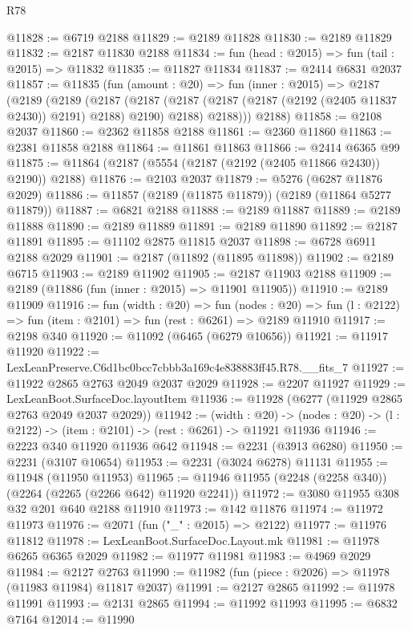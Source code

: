 \begin{lexlean}{R78}
\begin{coremodule}
@11828 := @6719 @2188
@11829 := @2189 @11828
@11830 := @2189 @11829
@11832 := @2187 @11830 @2188
@11834 := fun (head : @2015) => fun (tail : @2015) => @11832
@11835 := @11827 @11834
@11837 := @2414 @6831 @2037
@11857 := @11835
    (fun (amount : @20) =>
    fun (inner : @2015) =>
    @2187
      (@2189
        (@2189
          (@2187
            (@2187 (@2187 (@2187 (@2187 (@2192 (@2405 @11837 @2430)) @2191) @2188) @2190) @2188)
            @2188)))
      @2188)
@11858 := @2108 @2037
@11860 := @2362 @11858 @2188
@11861 := @2360 @11860
@11863 := @2381 @11858 @2188
@11864 := @11861 @11863
@11866 := @2414 @6365 @99
@11875 := @11864 (@2187 (@5554 (@2187 (@2192 (@2405 @11866 @2430)) @2190)) @2188)
@11876 := @2103 @2037
@11879 := @5276 (@6287 @11876 @2029)
@11886 := @11857 (@2189 (@11875 @11879)) (@2189 (@11864 @5277 @11879))
@11887 := @6821 @2188
@11888 := @2189 @11887
@11889 := @2189 @11888
@11890 := @2189 @11889
@11891 := @2189 @11890
@11892 := @2187 @11891
@11895 := @11102 @2875 @11815 @2037
@11898 := @6728 @6911 @2188 @2029
@11901 := @2187 (@11892 (@11895 @11898))
@11902 := @2189 @6715
@11903 := @2189 @11902
@11905 := @2187 @11903 @2188
@11909 := @2189 (@11886 (fun (inner : @2015) => @11901 @11905))
@11910 := @2189 @11909
@11916 := fun (width : @20) =>
  fun (nodes : @20) => fun (l : @2122) => fun (item : @2101) => fun (rest : @6261) => @2189 @11910
@11917 := @2198 @340
@11920 := @11092 (@6465 (@6279 @10656))
@11921 := @11917 @11920
@11922 := LexLeanPreserve.C6d1bc0bcc7cbbb3a169c4e838883ff45.R78.__fits_7
@11927 := @11922 @2865 @2763 @2049 @2037 @2029
@11928 := @2207 @11927
@11929 := LexLeanBoot.SurfaceDoc.layoutItem
@11936 := @11928 (@6277 (@11929 @2865 @2763 @2049 @2037 @2029))
@11942 := (width : @20) ->
  (nodes : @20) -> (l : @2122) -> (item : @2101) -> (rest : @6261) -> @11921 @11936
@11946 := @2223 @340 @11920 @11936 @642
@11948 := @2231 (@3913 @6280)
@11950 := @2231 (@3107 @10654)
@11953 := @2231 (@3024 @6278) @11131
@11955 := @11948 (@11950 @11953)
@11965 := @11946 @11955 (@2248 (@2258 @340)) (@2264 (@2265 (@2266 @642) @11920 @2241))
@11972 := @3080 @11955 @308 @32 @201 @640 @2188 @11910
@11973 := @142 @11876
@11974 := @11972 @11973
@11976 := @2071 (fun ("_" : @2015) => @2122)
@11977 := @11976 @11812
@11978 := LexLeanBoot.SurfaceDoc.Layout.mk
@11981 := @11978 @6265 @6365 @2029
@11982 := @11977 @11981
@11983 := @4969 @2029
@11984 := @2127 @2763
@11990 := @11982 (fun (piece : @2026) => @11978 (@11983 @11984) @11817 @2037)
@11991 := @2127 @2865
@11992 := @11978 @11991
@11993 := @2131 @2865
@11994 := @11992 @11993
@11995 := @6832 @7164
@12014 := @11990

\end{coremodule}
\end{lexlean}
